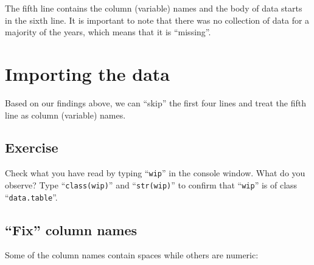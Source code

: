 \documentclass[a4paper,9pt,twocolumn,twoside,printwatermark=false]{pinp}
\begin{document}
The fifth line contains the column (variable) names and the body of data
starts in the sixth line. It is important to note that there was no
collection of data for a majority of the years, which means that it is
``missing''.

\section{Importing the data}\label{importing-the-data}

Based on our findings above, we can ``skip'' the first four lines and
treat the fifth line as column (variable) names.

\begin{Shaded}
\begin{Highlighting}[]
\StringTok{ }\NormalTok{(}\NormalTok{(}\NormalTok{, }\NormalTok{), }
              \NormalTok{, } \NormalTok{)}
\end{Highlighting}
\end{Shaded}

\subsection{Exercise}\label{exercise-1}

Check what you have read by typing ``\texttt{wip}'' in the console
window. What do you observe? Type ``\texttt{class(wip)}'' and
``\texttt{str(wip)}'' to confirm that ``\texttt{wip}'' is of class
``\texttt{data.table}''.

\subsection{\texorpdfstring{``Fix'' column
names}{Fix column names}}\label{fix-column-names}

Some of the column names contain spaces while others are numeric:

\begin{Shaded}
\begin{Highlighting}[]
\NormalTok{(}
\NormalTok{(}
\end{Highlighting}
\end{Shaded}
\end{document}
